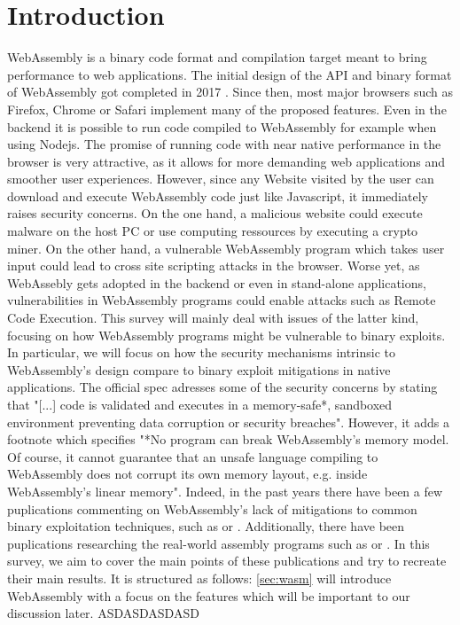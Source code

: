 \documentclass[sigconf]{acmart}
\begin{document}
\maketitle

\section{Introduction}
WebAssembly is a binary code format and compilation target meant to bring performance to web applications.  The initial design of the API and binary format of WebAssembly got completed in 2017 \cite{wasm_roadmap}. Since then, most major browsers such as Firefox, Chrome or Safari implement many of the proposed features. Even in the backend it is possible to run code compiled to WebAssembly for example when using Nodejs. The promise of running code with near native performance in the browser is very attractive, as it allows for more demanding web applications and smoother user experiences. However, since any Website visited by the user can download and execute WebAssembly code just like Javascript, it immediately raises security concerns. On the one hand, a malicious website could execute malware on the host PC or use computing ressources by executing a crypto miner. On the other hand, a vulnerable WebAssembly program which takes user input could lead to cross site scripting attacks in the browser. Worse yet, as WebAssebly gets adopted in the backend or even in stand-alone applications, vulnerabilities in WebAssembly programs could enable attacks such as Remote Code Execution. This survey will mainly deal with issues of the latter kind, focusing on how WebAssembly programs might be vulnerable to binary exploits. In particular, we will focus on how the security mechanisms intrinsic to WebAssembly's design compare to binary exploit mitigations in native applications. 
The official spec adresses some of the security concerns by stating that "[...] code is validated and executes in a memory-safe*, sandboxed environment preventing data corruption or security breaches". However, it adds a footnote which specifies "*No program can break WebAssembly’s memory model. Of course, it cannot guarantee that an unsafe language compiling to WebAssembly does not corrupt its own memory layout, e.g. inside WebAssembly’s linear memory". Indeed, in the past years there have been a few puplications commenting on WebAssembly's lack of mitigations to common binary exploitation techniques, such as \cite{mcfadden_security_2018} or \cite{lehmann_everything_2020}. Additionally, there have been puplications researching the real-world assembly programs such as \cite{musch_new_2019} or \cite{hilbig_empirical_2021}. In this survey, we aim to cover the main points of these publications and try to recreate their main results. It is structured as follows: \ref{sec:wasm} will introduce WebAssembly with a focus on the features which will be important to our discussion later. ASDASDASDASD
\end{document}

